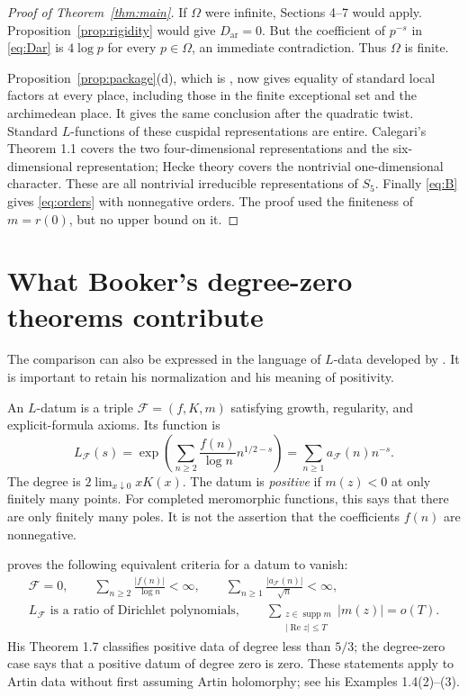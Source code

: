 \documentclass[11pt]{article}
\theoremstyle{definition}
\theoremstyle{remark}
\newcommand{\supp}{\operatorname{supp}}
\newcommand{\Rea}{\operatorname{Re}}
\numberwithin{equation}{section}
\begin{document}
\begin{proof}[Proof of Theorem~\ref{thm:main}]
If $\Omega$ were infinite, Sections 4--7 would apply. Proposition~\ref{prop:rigidity} would give $D_{\mathrm{ar}}=0$. But the coefficient of $p^{-s}$ in \eqref{eq:Dar} is $4\log p$ for every $p\in\Omega$, an immediate contradiction. Thus $\Omega$ is finite.

Proposition~\ref{prop:package}(d), which is \citet[Lemma 4.10 and the final proof of Theorem 1.2]{calegari}, now gives equality of standard local factors at every place, including those in the finite exceptional set and the archimedean place. It gives the same conclusion after the quadratic twist. Standard $L$-functions of these cuspidal representations are entire. Calegari's Theorem 1.1 covers the two four-dimensional representations and the six-dimensional representation; Hecke theory covers the nontrivial one-dimensional character. These are all nontrivial irreducible representations of $S_5$. Finally \eqref{eq:B} gives \eqref{eq:orders} with nonnegative orders. The proof used the finiteness of $m=r(0)$, but no upper bound on it.
\end{proof}

\section{What Booker's degree-zero theorems contribute}

The comparison can also be expressed in the language of $L$-data developed by \citet{booker2015}. It is important to retain his normalization and his meaning of positivity.

An $L$-datum is a triple $\mathcal F=(f,K,m)$ satisfying growth, regularity, and explicit-formula axioms. Its function is
\begin{equation}\label{eq:bookerL}
L_{\mathcal F}(s)
=\exp\left(\sum_{n\ge2}\frac{f(n)}{\log n}n^{1/2-s}\right)
=\sum_{n\ge1}a_{\mathcal F}(n)n^{-s}.
\end{equation}
The degree is $2\lim_{x\downarrow0}xK(x)$. The datum is \emph{positive} if $m(z)<0$ at only finitely many points. For completed meromorphic functions, this says that there are only finitely many poles. It is not the assertion that the coefficients $f(n)$ are nonnegative.

\citet[Theorem 1.6]{booker2015} proves the following equivalent criteria for a datum to vanish:
\begin{equation}\label{eq:bookercriteria}
\begin{gathered}
\mathcal F=0,\qquad
\sum_{n\ge2}\frac{|f(n)|}{\log n}<\infty,\qquad
\sum_{n\ge1}\frac{|a_{\mathcal F}(n)|}{\sqrt n}<\infty,\\
L_{\mathcal F}\text{ is a ratio of Dirichlet polynomials},\qquad
\sum_{\substack{z\in\supp m\\|\Rea z|\le T}}|m(z)|=o(T).
\end{gathered}
\end{equation}
His Theorem 1.7 classifies positive data of degree less than $5/3$; the degree-zero case says that a positive datum of degree zero is zero. These statements apply to Artin data without first assuming Artin holomorphy; see his Examples 1.4(2)--(3).
\end{document}
